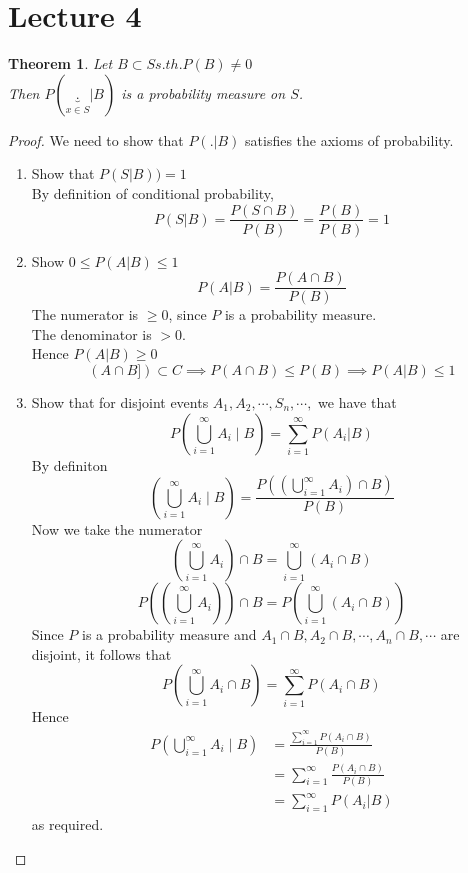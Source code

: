 \documentclass{article}
\let\ddd\cdots
\newtheorem{theorem}{Theorem}[section]
\theoremstyle{definition}
\theoremstyle{remark}
\theoremstyle{example}
\begin{document}
	\section*{Lecture 4}
	\begin{theorem}
		Let $B \subset S s.th. P(B) \neq 0$\\
		Then $P(\underbrace{.}_{x \in S}|B)$ is a probability measure on $S$.
	\end{theorem}
	\begin{proof}
		We need to show that $P(.|B)$ satisfies the axioms of probability.\\
		\begin{enumerate}
			\item Show that $P(S|B))=1$\\
			By definition of conditional probability, \[P(S|B)=\frac{P(S \cap B)}{P(B)} = \frac{P(B)}{P(B)}=1\]
			\item Show $0 \leq P(A|B) \leq 1$\\
			\[ P(A|B)=\frac{P(A \cap B)}{P(B)}\]
			The numerator is $\geq 0$, since $P$ is a probability measure.\\
			The denominator is $> 0$.\\
			Hence $P(A|B) \geq 0$\\
			\[ (A \cap B]) \subset C \implies P(A \cap B) \leq P(B) \implies P(A|B) \leq 1 \]
			\item Show that for disjoint events $A_1,A_2,\ddd,S_n,\ddd,$ we have that \[ P \left( \bigcup_{i=1}^\infty  A_i \mid B \right) = \sum_{i=1}^{\infty}P(A_i|B)\]
			By definiton \[ \left( \bigcup_{i=1}^\infty  A_i \mid B \right) = \frac{P(\left( \bigcup_{i=1}^\infty  A_i \right) \cap B)}{P(B)} \]
			Now we take the numerator \[\left(\bigcup_{i=1}^\infty A_i\right)\cap B = \bigcup_{i=1}^\infty(A_i \cap B) \]
			\[P\left(\left(\bigcup_{i=1}^\infty A_i\right)\right)\cap B = P \left(\bigcup_{i=1}^\infty(A_i \cap B)\right) \]
			Since $P$ is a probability measure and $A_1 \cap B, A_2 \cap B, \ddd, A_n \cap B, \ddd$ are disjoint, it follows that \[ P\left(\bigcup_{i=1}^\infty A_i \cap B \right) = \sum_{i=1}^{\infty}P(A_i \cap B)\]
			Hence \begin{align*}
				P\left(\bigcup_{i=1}^\infty A_i\mid B \right) & = \frac{\sum_{i=1}^{\infty}P(A_i \cap B)}{P(B)}\\
				& = \sum_{i=1}^{\infty}\frac{P(A_i \cap B)}{P(B)}\\
				& = \sum_{i=1}^{\infty}P(A_i|B)
			\end{align*} as required.
		\end{enumerate}
	\end{proof}
\end{document}

